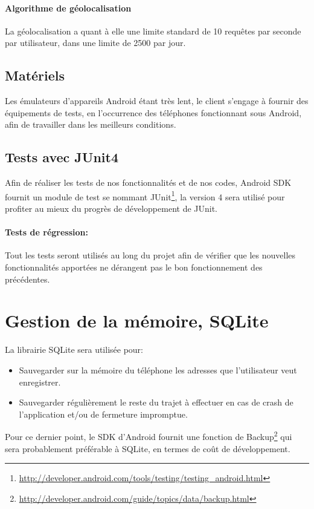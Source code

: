 \documentclass[12pt]{report}
\begin{document}
\paragraph{Algorithme de géolocalisation} La géolocalisation a quant à elle une limite standard de 10 requêtes par seconde par utilisateur, dans une limite de 2500 par jour.

\subsection{Matériels } Les émulateurs d'appareils Android étant très lent, le client s'engage à fournir des équipements de tests, en l'occurrence des téléphones fonctionnant sous Android, afin de travailler dans les meilleurs conditions.\\

\subsection{Tests avec JUnit4 }
Afin de réaliser les tests de nos fonctionnalités et de nos codes, Android SDK fournit un module de test se nommant JUnit\footnote{\url{http://developer.android.com/tools/testing/testing_android.html}}, la version 4 sera utilisé pour profiter au mieux du progrès de développement de JUnit. 
\paragraph{Tests de régression:} Tout les tests  seront utilisés au long du projet afin de vérifier que les nouvelles fonctionnalités apportées ne dérangent pas le bon fonctionnement des précédentes.

\section{Gestion de la mémoire, SQLite} La librairie SQLite sera utilisée pour:
\begin{itemize}
\item Sauvegarder sur la mémoire du téléphone les adresses que l'utilisateur veut enregistrer. 
\item Sauvegarder régulièrement le reste du trajet à effectuer en cas de crash de l'application et/ou de fermeture impromptue. 
\end{itemize} Pour ce dernier point, le SDK d'Android fournit une fonction de Backup\footnote{\url{http://developer.android.com/guide/topics/data/backup.html}} qui sera probablement préférable à SQLite, en termes de coût de développement.\\
\end{document}
